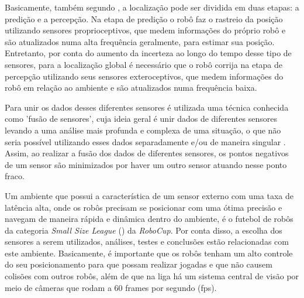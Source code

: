 \documentclass[acronym, symbols, table]{fei}
\begin{document}
	
	Basicamente, também segundo \textcite{PANIGRAHI20226019}, a localização pode ser dividida em duas etapas: a predição e a percepção. Na etapa de predição o robô faz o rastreio da posição utilizando sensores proprioceptivos, que medem informações do próprio robô e são atualizados numa alta frequência geralmente, para estimar sua posição. Entretanto, por conta do aumento da incerteza ao longo do tempo desse tipo de sensores, para a localização global é necessário que o robô corrija na etapa de percepção utilizando seus sensores exteroceptivos, que medem informações do robô em relação ao ambiente e são atualizados numa frequência baixa.
	
	Para unir os dados desses diferentes sensores é utilizada uma técnica conhecida como 'fusão de sensores', cuja ideia geral é unir dados de diferentes sensores levando a uma análise mais profunda e complexa de uma situação, o que não seria possível utilizando esses dados separadamente e/ou de maneira singular \cite{s16101569}. Assim, ao realizar a fusão dos dados de diferentes sensores, os pontos negativos de um sensor são minimizados por haver um outro sensor atuando nesse ponto fraco.
	
	Um ambiente que possui a característica de um sensor externo com uma taxa de latência alta, onde os robôs precisam se posicionar com uma ótima precisão e navegam de maneira rápida e dinâmica dentro do ambiente, é o futebol de robôs da categoria \textit{Small Size League} () da \textit{RoboCup}. Por conta disso, a escolha dos sensores a serem utilizados, análises, testes e conclusões estão relacionadas com este ambiente. Basicamente, é importante que os robôs tenham um alto controle do seu posicionamento para que possam realizar jogadas e que não causem colisões com outros robôs, além de que na liga há um sistema central de visão por meio de câmeras que rodam a 60 frames por segundo (fps).
	
\end{document}
